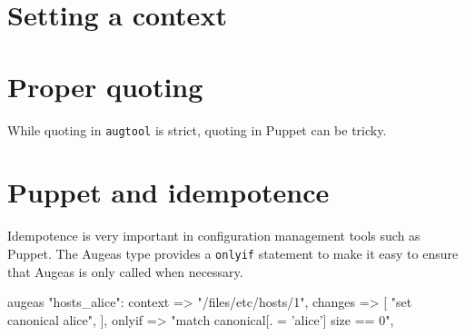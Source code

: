 \section{Setting a context}

\section{Proper quoting}

While quoting in \verb!augtool! is strict, quoting in Puppet can be tricky.




\section{Puppet and idempotence}

Idempotence is very important in configuration management tools such as Puppet. The Augeas type provides a \verb!onlyif! statement to make it easy to ensure that Augeas is only called when necessary.

\begin{puppet-augeas}[]
augeas { "hosts_alice":
   context => "/files/etc/hosts/1",
   changes => [
      "set canonical alice",
   ],
   onlyif => "match canonical[. = 'alice'] size == 0",
}
\end{puppet-augeas}

\begin{quote}
\end{quote}

